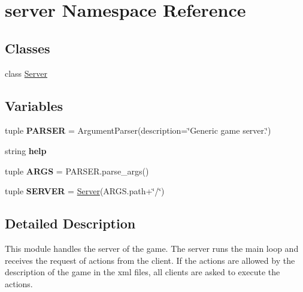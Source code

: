 \hypertarget{namespaceserver}{\section{server \-Namespace \-Reference}
\label{namespaceserver}
}
\subsection*{\-Classes}
\begin{DoxyCompactItemize}
\item 
class \hyperlink{classserver_1_1_server}{\-Server}
\end{DoxyCompactItemize}
\subsection*{\-Variables}
\begin{DoxyCompactItemize}
\item 
\hypertarget{namespaceserver_a1ca22f386448730aef8b5bf9742a79af}{tuple {\bfseries \-P\-A\-R\-S\-E\-R} = \-Argument\-Parser(description=\char`\"{}\-Generic game server.\char`\"{})}\label{namespaceserver_a1ca22f386448730aef8b5bf9742a79af}

\item 
string {\bfseries help}
\item 
\hypertarget{namespaceserver_aba8abc91d93e06ecdb4870d668590c4e}{tuple {\bfseries \-A\-R\-G\-S} = \-P\-A\-R\-S\-E\-R.\-parse\-\_\-args()}\label{namespaceserver_aba8abc91d93e06ecdb4870d668590c4e}

\item 
\hypertarget{namespaceserver_af04fcf0b55792c3873d000261d0371f3}{tuple {\bfseries \-S\-E\-R\-V\-E\-R} = \hyperlink{classserver_1_1_server}{\-Server}(\-A\-R\-G\-S.\-path+\char`\"{}/\char`\"{})}\label{namespaceserver_af04fcf0b55792c3873d000261d0371f3}

\end{DoxyCompactItemize}


\subsection{\-Detailed \-Description}
\begin{DoxyVerb}
This module handles the server of the game.
The server runs the main loop and receives the request of actions
from the client. If the actions are allowed by the description of the game
in the xml files, all clients are asked to execute the actions.
\end{DoxyVerb}
 

